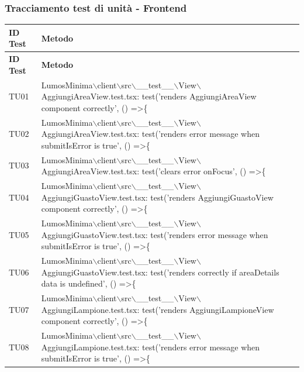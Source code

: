 \documentclass[12pt]{article}
\begin{document}
\subsubsection{Tracciamento test di unità - Frontend}
\scriptsize
\begin{xltabular}{\linewidth}{|>{\hsize}X|X|}

	\hline
	\textbf{ID Test} & \textbf{Metodo} \\
	\hline
	\endfirsthead
	\hline
	\textbf{ID Test} & \textbf{Metodo} \\
	\hline
	\endhead
	\hline
	TU01 & LumosMinima$\backslash$client$\backslash$src$\backslash$\_\_test\_\_$\backslash$View$\backslash$AggiungiAreaView.test.tsx: test('renders AggiungiAreaView component correctly', () =\textgreater \{ \\ \hline
	TU02 & LumosMinima$\backslash$client$\backslash$src$\backslash$\_\_test\_\_$\backslash$View$\backslash$AggiungiAreaView.test.tsx: test('renders error message when submitIsError is true', () =\textgreater \{ \\ \hline
	TU03 & LumosMinima$\backslash$client$\backslash$src$\backslash$\_\_test\_\_$\backslash$View$\backslash$AggiungiAreaView.test.tsx: test('clears error onFocus', () =\textgreater \{ \\ \hline
	TU04 & LumosMinima$\backslash$client$\backslash$src$\backslash$\_\_test\_\_$\backslash$View$\backslash$AggiungiGuastoView.test.tsx: test('renders AggiungiGuastoView component correctly', () =\textgreater \{ \\ \hline
	TU05 & LumosMinima$\backslash$client$\backslash$src$\backslash$\_\_test\_\_$\backslash$View$\backslash$AggiungiGuastoView.test.tsx: test('renders error message when submitIsError is true', () =\textgreater \{ \\ \hline
	TU06 & LumosMinima$\backslash$client$\backslash$src$\backslash$\_\_test\_\_$\backslash$View$\backslash$AggiungiGuastoView.test.tsx: test('renders correctly if areaDetails data is undefined', () =\textgreater \{ \\ \hline
	TU07 & LumosMinima$\backslash$client$\backslash$src$\backslash$\_\_test\_\_$\backslash$View$\backslash$AggiungiLampione.test.tsx: test('renders AggiungiLampioneView component correctly', () =\textgreater \{ \\ \hline
	TU08 & LumosMinima$\backslash$client$\backslash$src$\backslash$\_\_test\_\_$\backslash$View$\backslash$AggiungiLampione.test.tsx: test('renders error message when submitIsError is true', () =\textgreater \{ \\ \hline

\end{xltabular}
\end{document}
